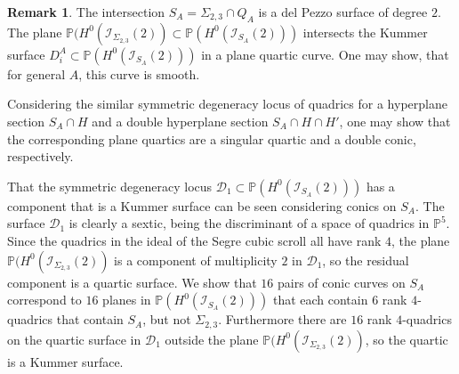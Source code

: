 \documentclass[a4paper,11pt]{amsart}
\theoremstyle{definition}
\newtheorem{rem}[thm]{Remark}
\numberwithin{equation}{section}
\numberwithin{equation}{section} \theoremstyle{definition}
\begin{document}
 \begin{rem} The intersection $S_A=\Sigma_{2,3}\cap Q_A$ is a del Pezzo surface of degree $2$.
 The plane ${{\mathbb{P}}}(H^0({\mathcal I}_{\Sigma_{2,3}}(2))\subset {{\mathbb{P}}}(H^0(\mathcal{I}_{S_A}(2)))$ intersects the Kummer surface  $D_i^A\subset {{\mathbb{P}}}(H^0(\mathcal{I}_{S_A}(2)))$ in a plane quartic curve.  One may show, that for general $A$, this curve is smooth.  
 
 
Considering the similar symmetric degeneracy locus of quadrics for a hyperplane section $S_A\cap H$ and a double hyperplane section $S_A\cap H\cap H'$, one may show that the corresponding plane quartics are a singular quartic and a double conic,  respectively.  
 \end{rem}
That the symmetric degeneracy locus ${\mathcal D}_1\subset {{\mathbb{P}}}(H^0(\mathcal{I}_{S_A}(2)))$ has a component that is a Kummer surface can be seen considering conics on $S_A$.  The surface ${\mathcal D}_1$ is clearly a sextic, being the discriminant of a space of quadrics in ${{\mathbb{P}}}^5$. Since the quadrics in the ideal of the Segre cubic scroll all have rank $4$, the plane ${{\mathbb{P}}}(H^0({\mathcal I}_{\Sigma_{2,3}}(2))$ is a component of multiplicity $2$ in ${\mathcal D}_1$, so the residual component is a quartic surface.  We show that $16$ pairs of conic curves on $S_A$  correspond to $16$ planes  in ${{\mathbb{P}}}(H^0(\mathcal{I}_{S_A}(2)))$ that each contain  $6$ rank $4$-quadrics that contain $S_A$, but not $\Sigma_{2,3}$.  Furthermore there are $16$  rank $4$-quadrics on the quartic surface in ${\mathcal D}_1$ outside the plane ${{\mathbb{P}}}(H^0({\mathcal I}_{\Sigma_{2,3}}(2))$, so the quartic is a Kummer surface.
\end{document}
